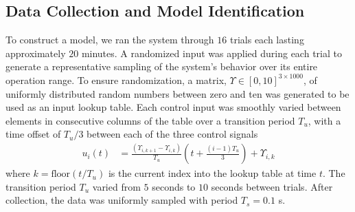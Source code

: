 \subsection{Data Collection and Model Identification}
\label{sec:datacollection}

To construct a model, we ran the system through $16$ trials each lasting approximately $20$ minutes.
A randomized input was applied during each trial to generate a representative sampling of the system's behavior over its entire operation range.
To ensure randomization, a matrix, $\Upsilon \in [0,10]^{3\times 1000}$, of uniformly distributed random numbers between zero and ten was generated to be used as an input lookup table.
Each control input was smoothly varied between elements in consecutive columns of the table over a transition period $T_u$, with a time offset of $T_u / 3$ between each of the three control signals
\begin{align}
    u_i (t) &= \frac{(\Upsilon_{i,k+1} - \Upsilon_{i,k})}{T_u} \left( t + \frac{(i-1) T_u}{3} \right) + \Upsilon_{i,k}
    \label{eq:input}
\end{align}
where $k = \text{floor}\left( {t} / {T_u} \right)$ is the current index into the lookup table at time $t$. 
The transition period $T_u$ varied from $5$ seconds to $10$ seconds between trials.
After collection, the data was uniformly sampled with period $T_s = 0.1$ s.

